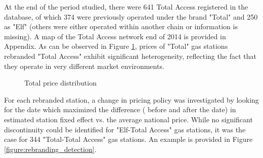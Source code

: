 \documentclass[11pt]{article}
\begin{document}
At the end of the period studied, there were 641 Total Access registered in the database, of which 374 were previously operated under the brand "Total" and 250 as "Elf" (others were either operated within another chain or information is missing). A map of the Total Access network end of 2014 is provided in Appendix. As can be observed in Figure \ref{fig:tot_price_distr}, prices of "Total" gas stations rebranded "Total Access" exhibit significant heterogeneity, reflecting the fact that they operate in very different market environments.

\begin{figure}
    \centering
    \qquad
    \caption{Total price distribution}
    \label{fig:tot_price_distr}
\end{figure}

For each rebranded station, a change in pricing policy was investigated by looking for the date which maximized the difference ( before and after the date) in estimated station fixed effect vs. the average national price. While no significant discontinuity could be identified for "Elf-Total Access" gas stations, it was the case for 344 "Total-Total Access" gas stations. An example is provided in Figure \ref{figure:rebranding_detection}.
\end{document}
